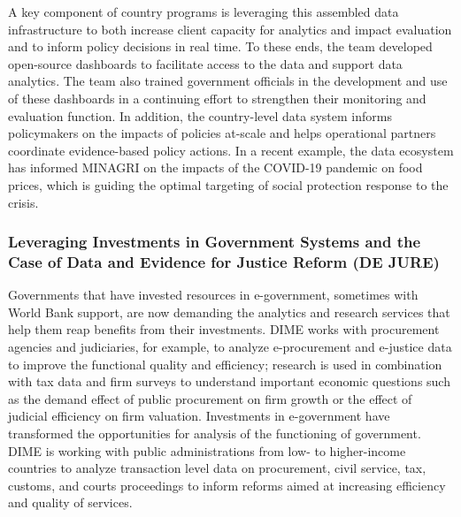 A key component of country programs is leveraging this assembled data infrastructure to both increase client capacity for analytics and impact evaluation and to inform policy decisions in real time. To these ends, the team developed open-source dashboards to facilitate access to the data and support data analytics. The team also trained government officials in the development and use of these dashboards in a continuing effort to strengthen their monitoring and evaluation function. In addition, the country-level data system informs policymakers on the impacts of policies at-scale and helps operational partners coordinate evidence-based policy actions. In a recent example, the data ecosystem has informed MINAGRI on the impacts of the COVID-19 pandemic on food prices, which is guiding the optimal targeting of social protection response to the crisis.

\hypertarget{leveraging-investments-in-government-systems-and-the-case-of-data-and-evidence-for-justice-reform-de-jure}{%
\subsubsection{Leveraging Investments in Government Systems and the Case of Data and Evidence for Justice Reform (DE JURE)}\label{leveraging-investments-in-government-systems-and-the-case-of-data-and-evidence-for-justice-reform-de-jure}}

Governments that have invested resources in e-government, sometimes with World Bank support, are now demanding the analytics and research services that help them reap benefits from their investments. DIME works with procurement agencies and judiciaries, for example, to analyze e-procurement and e-justice data to improve the functional quality and efficiency; research is used in combination with tax data and firm surveys to understand important economic questions such as the demand effect of public procurement on firm growth or the effect of judicial efficiency on firm valuation. Investments in e-government have transformed the opportunities for analysis of the functioning of government. DIME is working with public administrations from low- to higher-income countries to analyze transaction level data on procurement, civil service, tax, customs, and courts proceedings to inform reforms aimed at increasing efficiency and quality of services.

